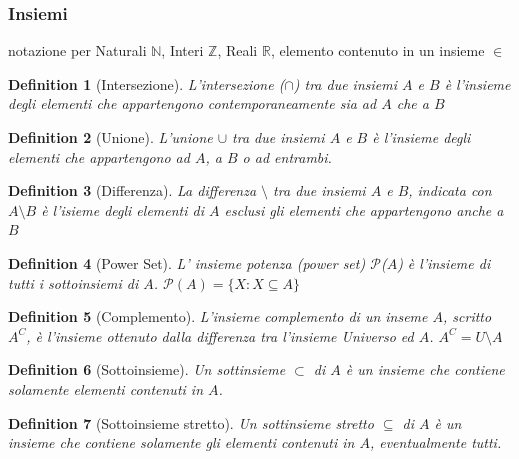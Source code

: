 \documentclass[a4paper]{article}
\newtheorem*{definition}{Definition}
\begin{document}
\subsubsection{Insiemi}
notazione per Naturali $ \mathbb{N} $, Interi $ \mathbb{Z} $, Reali $ \mathbb{R} $, elemento contenuto in un insieme $ \in $
\newline
\begin{definition}[Intersezione]L'intersezione ($\cap$) tra due insiemi $A$ e $B$ è l'insieme degli elementi che appartengono contemporaneamente sia ad $A$ che a $B$
\end{definition}
\begin{definition}[Unione]L'unione $\cup$ tra due insiemi $A$ e $B$ è l'insieme degli elementi che appartengono ad $A$, a $B$ o ad entrambi.
\end{definition}
\begin{definition}[Differenza]La differenza $\setminus$ tra due insiemi $A$ e $B$, indicata con $A \setminus B$ è l'isieme degli elementi di $A$ esclusi gli elementi che appartengono anche a $B$
\end{definition}
\begin{definition}[Power Set]L' insieme potenza (power set) $\mathcal{P}$($A$) è l'insieme di tutti i sottoinsiemi di $A$. $\mathcal{P}(A)=\{X : X \subseteq A\}$ 
\end{definition}
\begin{definition}[Complemento]L'insieme complemento di un inseme $A$, scritto $A^{C}$, è l'insieme ottenuto dalla differenza tra l'insieme Universo ed $A$. $A^{C} = U \setminus A$
\end{definition}
\begin{definition}[Sottoinsieme]Un sottinsieme $ \subset $ di $A$ è un insieme che contiene solamente elementi contenuti in $A$.
\end{definition}
\begin{definition}[Sottoinsieme stretto]Un sottinsieme stretto $ \subseteq $  di $A$ è un insieme che contiene solamente gli elementi contenuti in $A$, eventualmente tutti.
\end{definition}
\end{document}
